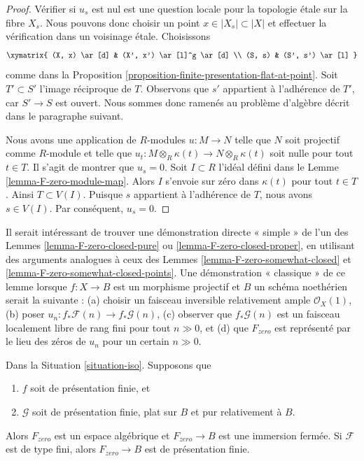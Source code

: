 \begin{proof}
Vérifier si $u_s$ est nul est une question locale pour la topologie \'etale sur la fibre $X_s$.
Nous pouvons donc choisir un point $x \in |X_s| \subset |X|$ et effectuer la vérification
dans un voisinage \'etale. Choisissons
$$
\xymatrix{
(X, x) \ar[d] & (X', x') \ar[l]^g \ar[d] \\
(S, s) & (S', s') \ar[l]
}
$$
comme dans la Proposition \ref{proposition-finite-presentation-flat-at-point}.
Soit $T' \subset S'$ l'image réciproque de $T$. Observons que
$s'$ appartient à l'adhérence de $T'$, car $S' \to S$ est ouvert.
Nous sommes donc ramenés au problème d'algèbre décrit dans le
paragraphe suivant.

\medskip\noindent
Nous avons une application de $R$-modules $u : M \to N$ telle que $N$ soit projectif
comme $R$-module et telle que
$u_t : M \otimes_R \kappa(t) \to N \otimes_R \kappa(t)$
soit nulle pour tout $t \in T$. Il s'agit de montrer que $u_s = 0$.
Soit $I \subset R$ l'idéal défini dans le Lemme \ref{lemma-F-zero-module-map}.
Alors $I$ s'envoie sur zéro dans $\kappa(t)$ pour tout $t \in T$.
Ainsi $T \subset V(I)$. Puisque $s$ appartient à l'adhérence de $T$,
nous avons $s \in V(I)$. Par conséquent, $u_s = 0$.
\end{proof}

\noindent
Il serait intéressant de trouver une démonstration directe « simple » de l'un des
Lemmes \ref{lemma-F-zero-closed-pure} ou
\ref{lemma-F-zero-closed-proper},
en utilisant des arguments analogues à ceux des
Lemmes \ref{lemma-F-zero-somewhat-closed} et
\ref{lemma-F-zero-somewhat-closed-points}.
Une démonstration « classique » de ce lemme lorsque $f : X \to B$ est un morphisme
projectif et $B$ un schéma noethérien serait la suivante : (a) choisir un faisceau inversible
relativement ample $\mathcal{O}_X(1)$, (b) poser
$u_n : f_*\mathcal{F}(n) \to f_*\mathcal{G}(n)$,
(c) observer que $f_*\mathcal{G}(n)$ est un faisceau localement libre de rang fini
pour tout $n \gg 0$, et (d) que $F_{zero}$ est représenté par le lieu des zéros
de $u_n$ pour un certain $n \gg 0$.

\begin{lemma}
\label{lemma-F-zero-closed-pure}
Dans la Situation \ref{situation-iso}. Supposons que
\begin{enumerate}
\item $f$ soit de présentation finie, et
\item $\mathcal{G}$ soit de présentation finie,
plat sur $B$ et pur relativement à $B$.
\end{enumerate}
Alors $F_{zero}$ est un espace algébrique et $F_{zero} \to B$
est une immersion fermée. Si $\mathcal{F}$ est de type fini, alors
$F_{zero} \to B$ est de présentation finie.
\end{lemma}

